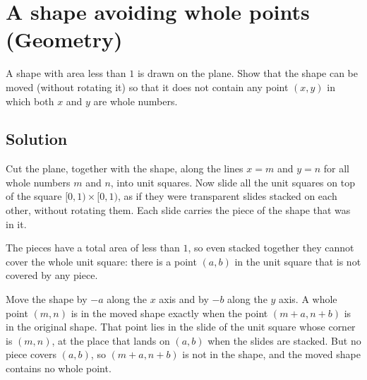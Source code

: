 \section {A shape avoiding whole points (Geometry)}

A shape with area less than $1$ is drawn on the plane.
Show that the shape can be moved (without rotating it) so that it does not contain any point $(x,y)$ in which both $x$ and $y$ are whole numbers.

\subsection{Solution}

Cut the plane, together with the shape, along the lines $x=m$ and $y=n$ for all whole numbers $m$ and $n$, into unit squares.
Now slide all the unit squares on top of the square $[0,1) \times [0,1)$, as if they were transparent slides stacked on each other,
without rotating them. Each slide carries the piece of the shape that was in it.

The pieces have a total area of less than $1$, so even stacked together they cannot cover the whole unit square:
there is a point $(a,b)$ in the unit square that is not covered by any piece.

Move the shape by $-a$ along the $x$ axis and by $-b$ along the $y$ axis.
A whole point $(m,n)$ is in the moved shape exactly when the point $(m+a, n+b)$ is in the original shape.
That point lies in the slide of the unit square whose corner is $(m,n)$, at the place that lands on $(a,b)$ when the slides are stacked.
But no piece covers $(a,b)$, so $(m+a,n+b)$ is not in the shape, and the moved shape contains no whole point.
